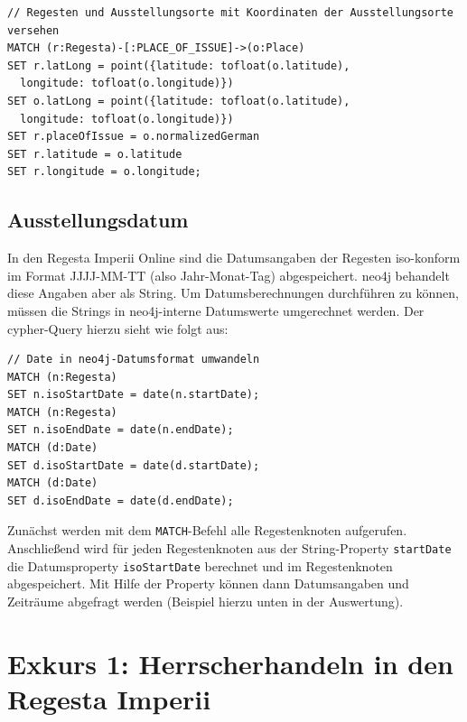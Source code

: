\documentclass[ngerman,]{scrreprt}
\begin{document}
\begin{verbatim}
// Regesten und Ausstellungsorte mit Koordinaten der Ausstellungsorte versehen
MATCH (r:Regesta)-[:PLACE_OF_ISSUE]->(o:Place)
SET r.latLong = point({latitude: tofloat(o.latitude),
  longitude: tofloat(o.longitude)})
SET o.latLong = point({latitude: tofloat(o.latitude),
  longitude: tofloat(o.longitude)})
SET r.placeOfIssue = o.normalizedGerman
SET r.latitude = o.latitude
SET r.longitude = o.longitude;
\end{verbatim}

\subsection{Ausstellungsdatum}\label{ausstellungsdatum}

In den Regesta Imperii Online sind die Datumsangaben der Regesten iso-konform im Format JJJJ-MM-TT (also Jahr-Monat-Tag) abgespeichert. neo4j behandelt diese Angaben aber als String. Um Datumsberechnungen durchführen zu können, müssen die Strings in neo4j-interne Datumswerte umgerechnet werden. Der cypher-Query hierzu sieht wie folgt aus:

\begin{verbatim}
// Date in neo4j-Datumsformat umwandeln
MATCH (n:Regesta)
SET n.isoStartDate = date(n.startDate);
MATCH (n:Regesta)
SET n.isoEndDate = date(n.endDate);
MATCH (d:Date)
SET d.isoStartDate = date(d.startDate);
MATCH (d:Date)
SET d.isoEndDate = date(d.endDate);
\end{verbatim}

Zunächst werden mit dem \texttt{MATCH}-Befehl alle Regestenknoten aufgerufen. Anschließend wird für jeden Regestenknoten aus der String-Property \texttt{startDate} die Datumsproperty \texttt{isoStartDate} berechnet und im Regestenknoten abgespeichert. Mit Hilfe der Property können dann Datumsangaben und Zeiträume abgefragt werden (Beispiel hierzu unten in der Auswertung).

\section{Exkurs 1: Herrscherhandeln in den Regesta Imperii}\label{exkurs-1-herrscherhandeln-in-den-regesta-imperii}
\end{document}
